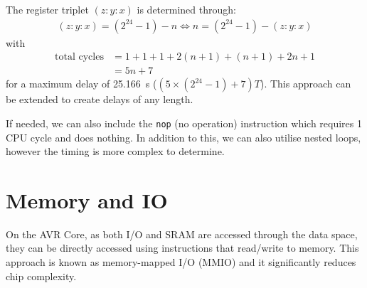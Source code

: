 \documentclass[a4paper]{report}
\begin{document}
The register triplet \(\left( z:y:x \right)\) is determined through:
\begin{align*}
    \left( z:y:x \right) = \left( 2^{24} - 1 \right) - n \iff n = \left( 2^{24} - 1 \right) - \left( z:y:x \right)
\end{align*}
with
\begin{align*}
    \text{total cycles} & = 1 + 1 + 1 + 2 \left( n + 1 \right) + \left( n + 1 \right) + 2 n + 1 \\
                        & = 5n + 7
\end{align*}
for a maximum delay of \qty{25.166}{s} (\(\left(5 \times \left( 2^{24} - 1 \right) + 7 \right) T\)).
This approach can be extended to create delays of any length.

If needed, we can also include the \texttt{nop} (no
operation) instruction which requires 1 CPU cycle and does nothing. In
addition to this, we can also utilise nested loops, however the timing
is more complex to determine.
\section{Memory and IO}
On the AVR Core, as both I/O and SRAM are accessed through the data
space, they can be directly accessed using instructions that read/write
to memory. This approach is known as memory-mapped I/O (MMIO) and it
significantly reduces chip complexity.
\end{document}

